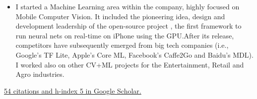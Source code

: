 \documentclass[10pt,a4paper,academicons]{altacv}
\begin{document}

\begin{itemize}
  \item I started a Machine Learning area within the company, highly focused on Mobile Computer Vision. It included the pioneering idea, design and development leadership of the open-source project {}, the first framework to run neural nets on real-time on iPhone using the GPU.\@ After its release, competitors have subsequently emerged from big tech companies (i.e., Google’s TF Lite, Apple’s Core ML, Facebook’s Caffe2Go and Baidu’s MDL). I worked also on other CV+ML projects for the Entertainment, Retail and Agro industries.
\end{itemize}

\divider{}



{\color{cyan}\href{https://scholar.google.com/citations?user=i2LNBfUAAAAJ}{54 citations and h-index 5 in Google Scholar.}}

\vspace{3mm}

\nocite{*}



\printbibliography[heading=pubtype,title={\printinfo{\faGroup}{Conference Proceedings}},type=inproceedings]


\printbibliography[heading=pubtype,title={\printinfo{\faGroup}{Workshop Proceedings}},type=incollection]

\printbibliography[heading=pubtype,title={\printinfo{\faGraduationCap}{Theses}},type=thesis]

\printbibliography[heading=pubtype,title={\printinfo{\faAsterisk}{Non Refereed}},type=misc]


\end{document}
